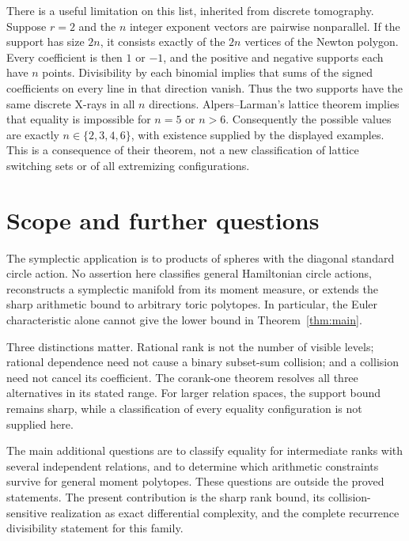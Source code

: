 \documentclass[11pt]{article}
\theoremstyle{definition}
\theoremstyle{remark}
\numberwithin{equation}{section}
\begin{document}
There is a useful limitation on this list, inherited from discrete
tomography. Suppose $r=2$ and the $n$ integer exponent vectors are
pairwise nonparallel. If the support has size $2n$, it consists exactly
of the $2n$ vertices of the Newton polygon. Every coefficient is then
$1$ or $-1$, and the positive and negative supports each have $n$
points. Divisibility by each binomial implies that sums of the signed
coefficients on every line in that direction vanish. Thus the two
supports have the same discrete X-rays in all $n$ directions.
Alpers--Larman's lattice theorem \cite[Theorem 2.2]{AlpersLarman}
implies that equality is impossible for $n=5$ or $n>6$.
Consequently the possible values are exactly $n\in\{2,3,4,6\}$,
with existence supplied by the displayed examples. This is a consequence
of their theorem, not a new classification of lattice switching sets or
of all extremizing configurations.

\section{Scope and further questions}
The symplectic application is to products of spheres with the diagonal
standard circle action. No assertion here classifies general Hamiltonian
circle actions, reconstructs a symplectic manifold from its moment
measure, or extends the sharp arithmetic bound to arbitrary toric
polytopes. In particular, the Euler characteristic alone cannot give
the lower bound in Theorem~\ref{thm:main}.

Three distinctions matter. Rational rank is not the number of visible
levels; rational dependence need not cause a binary subset-sum collision;
and a collision need not cancel its coefficient. The corank-one theorem
resolves all three alternatives in its stated range. For larger relation
spaces, the support bound remains sharp, while a classification of every
equality configuration is not supplied here.

The main additional questions are to classify equality for intermediate
ranks with several independent relations, and to determine which
arithmetic constraints survive for general moment polytopes. These
questions are outside the proved statements. The present contribution
is the sharp rank bound, its collision-sensitive realization as exact
differential complexity, and the complete recurrence divisibility
statement for this family.
\end{document}
